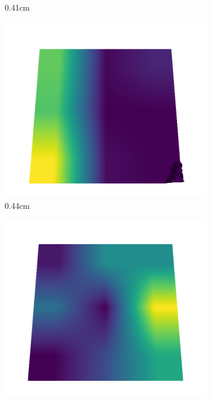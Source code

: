 \begin{figure}[H]
\begin{subfigure}[b]{0.192\linewidth}
    \caption{0.41cm}
    \label{fig : quarry-best-6}
    \end{subfigure}
    \begin{subfigure}[b]{0.192\linewidth}
    \includegraphics[width=\linewidth]{../img/5/quarry/best/44-patch-3d-majavi-colormap-60.png}
    \caption{0.44cm}
    \label{fig : quarry-best-7}
    \end{subfigure}
    \begin{subfigure}[b]{0.192\linewidth}
    \includegraphics[width=\linewidth]{../img/5/quarry/best/46-patch-3d-majavi-colormap-70.png}

\end{subfigure}
\end{figure}
